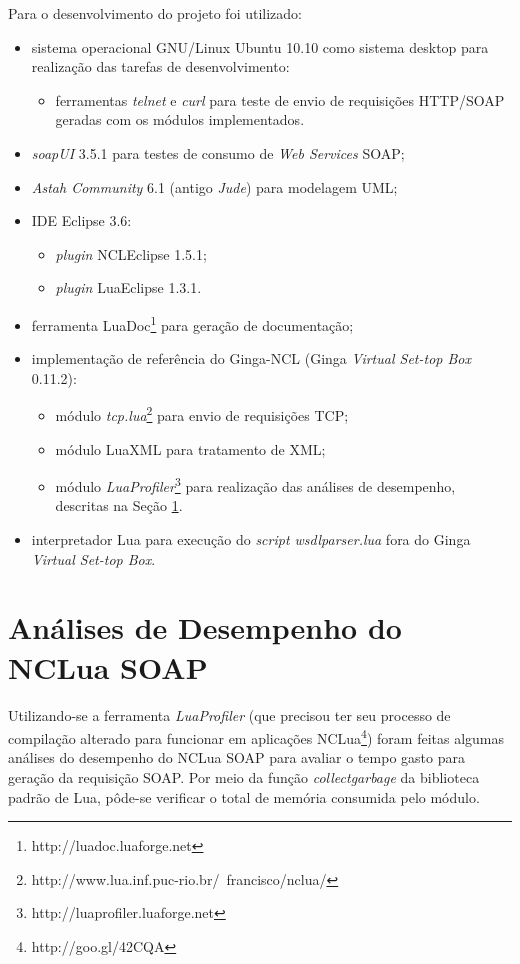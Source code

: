 Para o desenvolvimento do projeto foi utilizado:
\begin{itemize}
	\item sistema operacional GNU/Linux Ubuntu 10.10 como sistema desktop para realização das tarefas de desenvolvimento:
  \begin{itemize}
  		\item ferramentas \textit{telnet} e \textit{curl} para teste de envio de requisições HTTP/SOAP geradas com os módulos implementados.
  	\end{itemize}	
  \item \textit{soapUI} 3.5.1 para testes de consumo de \textit{Web Services} SOAP;
  \item \textit{Astah Community} 6.1 (antigo \textit{Jude}) para modelagem UML;
	\item IDE Eclipse 3.6:
	\begin{itemize}
		\item \textit{plugin} NCLEclipse 1.5.1;
		\item \textit{plugin} LuaEclipse 1.3.1.
	\end{itemize}
	\item ferramenta LuaDoc\footnote{http://luadoc.luaforge.net} para geração de documentação;
	\item implementação de referência do Ginga-NCL (Ginga \textit{Virtual Set-top Box} 0.11.2):
	\begin{itemize}
		\item módulo \textit{tcp.lua}\footnote{http://www.lua.inf.puc-rio.br/~francisco/nclua/} para envio de requisições TCP;
		\item módulo LuaXML para tratamento de XML;
		\item módulo \textit{LuaProfiler}\footnote{http://luaprofiler.luaforge.net}
	para realização das análises de desempenho, descritas na Seção \ref{sec:analise}.
	\end{itemize}
	\item interpretador Lua para execução do \textit{script wsdlparser.lua} fora do Ginga \textit{Virtual Set-top Box}.
\end{itemize}

\section{Análises de Desempenho do NCLua SOAP} \label{sec:analise}

Utilizando-se a ferramenta \textit{LuaProfiler} (que precisou ter seu processo de compilação alterado para funcionar 
em aplicações NCLua\footnote{http://goo.gl/42CQA}) foram feitas algumas análises
do desempenho do NCLua SOAP para avaliar o tempo gasto para geração da requisição SOAP.
Por meio da função \textit{collectgarbage} da biblioteca padrão de Lua, pôde-se verificar
o total de memória consumida pelo módulo. 

